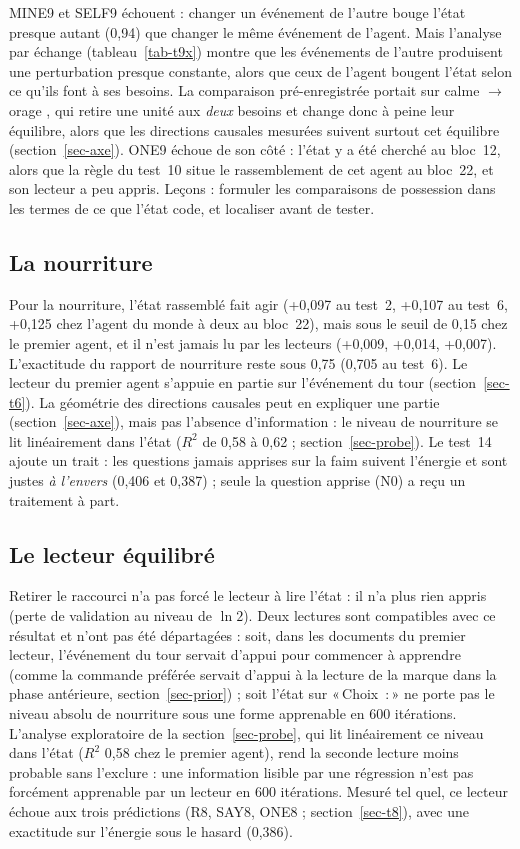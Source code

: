 \documentclass[11pt,a4paper]{article}
\newcommand{\Choix}{«\,Choix~:\,»}
\begin{document}
MINE9 et SELF9 échouent : changer un événement de l'autre bouge l'état presque
autant (0,94) que changer le même événement de l'agent. Mais l'analyse par échange
(tableau~\ref{tab-t9x}) montre que les événements de l'autre produisent une
perturbation presque constante, alors que ceux de l'agent bougent l'état selon ce
qu'ils font à ses besoins. La comparaison pré-enregistrée portait sur
\og calme \fg{}$\to$\og orage \fg{}, qui retire une unité aux \emph{deux} besoins et
change donc à peine leur équilibre, alors que les directions causales mesurées
suivent surtout cet équilibre (section~\ref{sec-axe}). ONE9 échoue de son côté : l'état y a été cherché au bloc~12, alors que la règle du
test~10 situe le rassemblement de cet agent au bloc~22, et son lecteur a peu appris. Leçons : formuler les comparaisons de possession dans les
termes de ce que l'état code, et localiser avant de tester.

\subsection{La nourriture}

Pour la nourriture, l'état rassemblé fait agir (+0,097 au test~2, +0,107 au
test~6, +0,125 chez l'agent du monde à deux au bloc~22), mais sous le seuil de
0,15 chez le premier agent, et il n'est jamais lu par les lecteurs (+0,009, +0,014,
+0,007). L'exactitude du rapport de nourriture reste sous 0,75 (0,705 au test~6).
Le lecteur du premier agent s'appuie en partie sur l'événement du tour
(section~\ref{sec-t6}). La géométrie des directions causales peut en expliquer une
partie (section~\ref{sec-axe}), mais pas l'absence d'information : le niveau de
nourriture se lit linéairement dans l'état ($R^2$ de 0,58 à 0,62 ;
section~\ref{sec-probe}). Le test~14 ajoute un trait : les questions jamais apprises
sur la faim suivent l'énergie et sont justes \emph{à l'envers} (0,406 et 0,387) ; seule
la question apprise (N0) a reçu un traitement à part.

\subsection{Le lecteur équilibré}

Retirer le raccourci n'a pas forcé le lecteur à lire l'état : il n'a plus rien
appris (perte de validation au niveau de $\ln2$). Deux lectures sont compatibles
avec ce résultat et n'ont pas été départagées : soit, dans les documents du
premier lecteur, l'événement du tour servait d'appui pour commencer à apprendre
(comme la commande préférée servait d'appui à la lecture de la marque dans la phase
antérieure, section~\ref{sec-prior}) ; soit l'état sur \Choix{} ne porte pas le
niveau absolu de nourriture sous une forme apprenable en 600 itérations. L'analyse
exploratoire de la section~\ref{sec-probe}, qui lit linéairement ce niveau dans
l'état ($R^2$ 0,58 chez le premier agent), rend la seconde lecture moins probable
sans l'exclure : une information lisible par une régression n'est pas forcément
apprenable par un lecteur en 600 itérations. Mesuré tel quel, ce lecteur échoue aux
trois prédictions (R8, SAY8, ONE8 ; section~\ref{sec-t8}), avec une exactitude sur
l'énergie sous le hasard (0,386).
\end{document}
